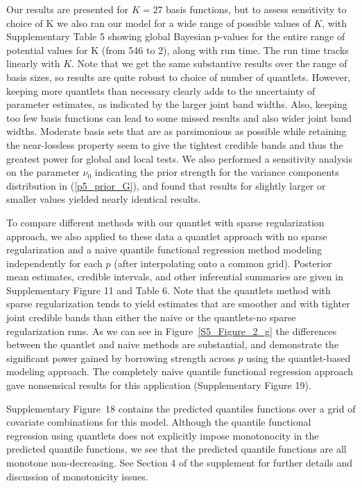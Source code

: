 \documentclass[11pt]{article}
\begin{document}
Our results are presented for $K=27$ basis functions, but to assess sensitivity to choice of K we also ran our model for a wide range of possible values of $K$, with Supplementary Table 5 showing global Bayesian p-values for the entire range
of potential values for K (from 546 to 2), along with run time.  The run time tracks linearly with $K$.  Note that we get the same
substantive results over the range of basis sizes, so results are quite robust to choice of number of quantlets.  However, keeping more quantlets than necessary clearly adds to the uncertainty of parameter estimates, as indicated by the larger joint band widths. Also, keeping too few basis functions can lead to some missed results and also wider joint band widths.  Moderate basis sets that are as parsimonious as possible while retaining the near-lossless property seem to give the tightest credible bands and thus the greatest power for global and local tests.
 We also performed a sensitivity analysis on the parameter $\nu_0$ indicating the prior strength for the variance components distribution in (\ref{p5_prior_G}), and found that results for slightly larger or smaller values yielded nearly identical results. 

To compare different methods with our quantlet with sparse regularization approach, we also applied to these data a quantlet approach with no sparse regularization and %
a naive quantile functional regression method modeling independently for each $p$ (after interpolating onto a common grid). %
  Posterior mean estimates, credible intervals, and other inferential summaries are given in Supplementary Figure 11 and Table 6.  
    Note that the quantlets method with sparse regularization tends to yield estimates that are smoother and with tighter joint credible bands than either the naive or the quantlets-no sparse regularization runs.   As we can see in Figure~\ref{S5_Figure_2_g} the differences between the quantlet and naive methods are substantial, and demonstrate the significant power gained by borrowing strength across $p$ using the quantlet-based modeling approach.  The completely naive quantile functional regression approach gave nonsensical results for this application (Supplementary Figure 19).
    
     Supplementary Figure~18 contains the predicted quantiles functions over a grid of covariate combinations for this model.  Although the quantile functional regression using quantlets does not explicitly impose monotonocity in the predicted quantile functions, we see that the predicted quantile functions are all monotone non-decreasing. 
See Section 4 of the supplement for further details and discussion of monotonicity issues.
\end{document}
